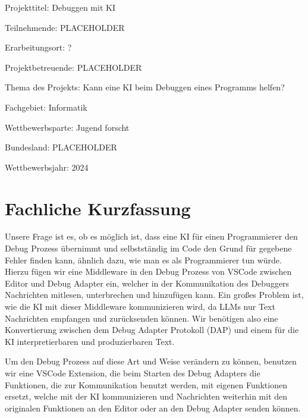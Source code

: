 \documentclass[a4paper,12pt,ngerman]{scrartcl}
\begin{document}
\begin{titlepage}
	Projekttitel: Debuggen mit KI
	\vspace{1cm}
	
	Teilnehmende: PLACEHOLDER
	
	Erarbeitungsort: ?
	
	Projektbetreuende: PLACEHOLDER
	
	Thema des Projekts: Kann eine KI beim Debuggen eines Programms helfen?
	
	Fachgebiet: Informatik
	
	Wettbewerbsparte: Jugend forscht
	
	Bundesland: PLACEHOLDER
	
	Wettbewerbsjahr: 2024
	
	\vspace{2cm}
	\vfill
\end{titlepage}
\clearpage
\tableofcontents
\clearpage

\section{Fachliche Kurzfassung}

Unsere Frage ist es, ob es möglich ist, dass eine KI für einen Programmierer den Debug Prozess übernimmt und selbstständig im Code den Grund für gegebene Fehler finden kann, ähnlich dazu, wie man es als Programmierer tun würde. Hierzu fügen wir eine Middleware in den Debug Prozess von VSCode zwischen Editor und Debug Adapter ein, welcher in der Kommunikation des Debuggers Nachrichten mitlesen, unterbrechen und hinzufügen kann. Ein großes Problem ist, wie die KI mit dieser Middleware kommunizieren wird, da LLMs nur Text Nachrichten empfangen und zurücksenden können. Wir benötigen also eine Konvertierung zwischen dem Debug Adapter Protokoll (DAP) und einem für die KI interpretierbaren und produzierbaren Text.

Um den Debug Prozess auf diese Art und Weise verändern zu können, benutzen wir eine VSCode Extension, die beim Starten des Debug Adapters die Funktionen, die zur Kommunikation benutzt werden, mit eigenen Funktionen ersetzt, welche mit der KI kommunizieren und Nachrichten weiterhin mit den originalen Funktionen an den Editor oder an den Debug Adapter senden können.
\end{document}

